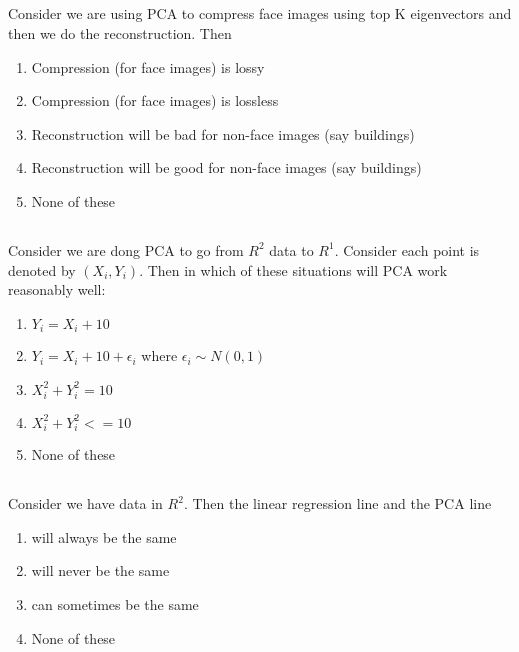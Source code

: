 \begin{frame}
\section{}
Consider we are using PCA to compress face images using top K eigenvectors and then we do the reconstruction. Then
\begin{enumerate}
\item Compression (for face images) is lossy    %
\item Compression (for face images) is lossless
\item Reconstruction will be bad for non-face images (say buildings)    %
\item Reconstruction will be good for non-face images (say buildings)
\item None of these
\end{enumerate}
\end{frame}

\begin{frame}
\section{}
Consider we are dong PCA to go from $R^2$ data to $R^1$. Consider each point is denoted by $(X_i,Y_i)$. Then in which of these situations will PCA work reasonably well:
\begin{enumerate}
\item $Y_i=X_i+10$    %
\item $Y_i=X_i+10+\epsilon_i$ where $\epsilon_i\sim N(0,1)$   %
\item $X_i^2+Y_i^2 = 10$
\item $X_i^2+Y_i^2 <= 10$
\item None of these
\end{enumerate}
\end{frame}

\begin{frame}
\section{}
Consider we have data in $R^2$. Then the linear regression line and the PCA line
\begin{enumerate}
\item will always be the same
\item will never be the same
\item can sometimes be the same   %
\item None of these
\end{enumerate}
\end{frame}

